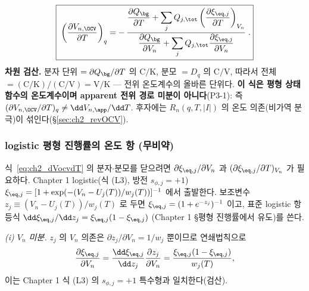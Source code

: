 \begin{equation}
\boxed{\;\left(\frac{\partial V_{n,\OCV}}{\partial T}\right)_q
=-\,\frac{\dfrac{\partial Q_\bg}{\partial T}+\displaystyle\sum_{j}Q_{j,\tot}\left(\dfrac{\partial\xi_{\eq,j}}{\partial T}\right)_{V_n}}
{\dfrac{\partial Q_\bg}{\partial V_n}+\displaystyle\sum_{j}Q_{j,\tot}\dfrac{\partial\xi_{\eq,j}}{\partial V_n}}\;.}
\label{eq:ch2_dVocvdT}
\end{equation}
\textbf{차원 검산.} 분자 단위 $=\partial Q_\bg/\partial T$ 의 $\mathrm{C/K}$, 분모 $=D_q$ 의 $\mathrm{C/V}$,
따라서 전체 $=(\mathrm{C/K})/(\mathrm{C/V})=\mathrm{V/K}$ — 전위 온도계수의 올바른 단위다. \textbf{이 식은 평형
상태함수의 온도계수이며 apparent 전위 경로 미분이 아니다}(P3-1): 즉 $(\partial V_{n,\OCV}/\partial T)_q\ne
\dd V_{n,\app}/\dd T$. 후자에는 $R_n(q,T,|I|)$ 의 온도 의존(비가역 분극)이 섞인다(\S\ref{sec:ch2_revOCV}).

\subsubsection{logistic 평형 진행률의 온도 항 (무비약)}\label{sec:ch2_ocvT_logistic}
식~\eqref{eq:ch2_dVocvdT} 의 분자$\cdot$분모를 닫으려면 $\partial\xi_{\eq,j}/\partial V_n$ 과
$(\partial\xi_{\eq,j}/\partial T)_{V_n}$ 가 필요하다. Chapter 1 logistic(식 (L3), 방전 $s_{\phi,j}=+1$)
$\xi_{\eq,j}=[1+\exp(-(V_n-U_j(T))/w_j(T))]^{-1}$ 에서 출발한다. 보조변수 $z_j\equiv(V_n-U_j(T))/w_j(T)$ 로 두면
$\xi_{\eq,j}=(1+e^{-z_j})^{-1}$ 이고, 표준 logistic 항등식 $\dd\xi_{\eq,j}/\dd z_j=\xi_{\eq,j}(1-\xi_{\eq,j})$
(Chapter 1 \S 평형 진행률에서 유도)를 쓴다.

\emph{(i) $V_n$ 미분.} $z_j$ 의 $V_n$ 의존은 $\partial z_j/\partial V_n=1/w_j$ 뿐이므로 연쇄법칙으로
\begin{equation}
\frac{\partial\xi_{\eq,j}}{\partial V_n}=\frac{\dd\xi_{\eq,j}}{\dd z_j}\frac{\partial z_j}{\partial V_n}
=\frac{\xi_{\eq,j}(1-\xi_{\eq,j})}{w_j(T)},
\label{eq:ch2_dxidV}
\end{equation}
이는 Chapter 1 식 (L3) 의 $s_{\phi,j}=+1$ 특수형과 일치한다(검산).

